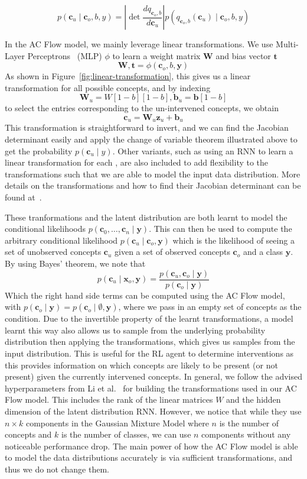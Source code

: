 \[p(\mathbf{c}_u \mid \mathbf{c}_o, b, y) = \left | 
\mathop{\mathrm{det}} \frac{d q_{\mathbf{c}_o, b}}{d \mathbf{c}_u}
\right | p(q_{\mathbf{c}_o, b}(\mathbf{c}_u) \mid \mathbf{c}_o, b, y)\]

In the AC Flow model, we mainly leverage
linear transformations. We use Multi-Layer Perceptrons~\cite{feedforward} (MLP) 
$\phi$ to learn 
a weight matrix $\mathbf{W}$ and bias vector $\mathbf{t}$
\[\mathbf{W}, \mathbf{t} = \phi(\mathbf{c}_o, b, \mathbf{y})\]
As shown in Figure~\ref{fig:linear-transformation},
this gives us a linear transformation for all possible concepts,
and by indexing 
\[\mathbf{W}_{u} = W[1-b][1-b], \mathbf{b}_{u} = \mathbf{b}[1-b]\]
to select the entries corresponding to the un-intervened concepts, we obtain
\[\mathbf{c}_u = \mathbf{W}_{u}\mathbf{z}_u + \mathbf{b}_{u}\]
 This transformation is 
straightforward to invert, and we can find the Jacobian determinant easily and apply the change of variable
theorem illustrated above to get the probability $p(\mathbf{c}_u \mid y)$.
Other variants, such as using an RNN to learn a linear transformation
for each , are also included to add flexibility to the transformations such that
we are able to model the input data distribution. More details on the transformations
 and how to find their Jacobian determinant can be found at~\cite{tans}.

These tranformations and the latent distribution are both learnt to
 model the conditional likelihoods $p(\mathbf{c}_0, \ldots, \mathbf{c}_n \mid \mathbf{y})$.
This can then be used to compute the arbitrary conditional likelihood $p(\mathbf{c}_u \mid \mathbf{c}_o, \mathbf{y})$
which is the likelihood of
seeing a set of unobserved concepts $\mathbf{c}_u$
given a set of observed concepts $\mathbf{c}_o$ and a class $\mathbf{y}$. 
By using Bayes' theorem, we note that
\[p(\mathbf{c}_u \mid \mathbf{x}_o, \mathbf{y}) = \frac{p(\mathbf{c}_u, \mathbf{c}_o \mid \mathbf{y})}
{p(\mathbf{c}_o \mid \mathbf{y})}\]
Which the right hand side terms can be computed using the AC Flow model, with
$p(\mathbf{c}_o \mid \mathbf{y}) = p(\mathbf{c}_o \mid \emptyset, \mathbf{y})$, where we 
pass in an empty set of concepts as the condition.
Due to the invertible property of the learnt transformations,
a model learnt this way also allows us to sample from the underlying probability 
distribution then applying the transformations, which gives us 
samples from the input distribution.
This is useful for the RL agent to
determine interventions as
this provides information on which concepts are likely to be present 
(or not present) given the currently intervened
concepts.
In general, we follow the advised hyperparameters from Li et al.~\cite{acflow}
for building the transformations used in our AC Flow model. This includes the rank of the linear
matrices $W$ and the hidden dimension of the latent distribution RNN. However, we notice that while
they use $n \times k$ components in the Gaussian Mixture Model where $n$ is the number of concepts
and $k$ is the number of classes, we can use $n$ components without any noticeable performance drop. 
The main power of how the AC Flow model is able to model the data distributions accurately
is via sufficient transformations, and thus we do not change them.


